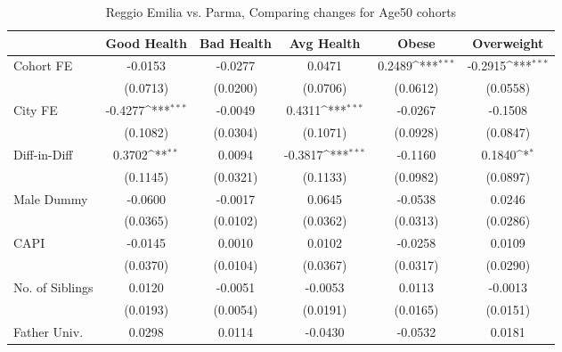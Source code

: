 \begin{table}[htbp]\centering
\def\sym#1{\ifmmode^{#1}\else\(^{#1}\)\fi}
\caption{Reggio Emilia vs. Parma, Comparing changes for Age50 cohorts}
\begin{tabular}{l*{5}{c}}
\toprule
            &\multicolumn{1}{c}{Good Health}&\multicolumn{1}{c}{Bad Health}&\multicolumn{1}{c}{Avg Health}&\multicolumn{1}{c}{Obese}&\multicolumn{1}{c}{Overweight}\\
\midrule
Cohort FE   &     -0.0153         &     -0.0277         &      0.0471         &      0.2489\sym{***}&     -0.2915\sym{***}\\
            &    (0.0713)         &    (0.0200)         &    (0.0706)         &    (0.0612)         &    (0.0558)         \\
\addlinespace
City FE     &     -0.4277\sym{***}&     -0.0049         &      0.4311\sym{***}&     -0.0267         &     -0.1508         \\
            &    (0.1082)         &    (0.0304)         &    (0.1071)         &    (0.0928)         &    (0.0847)         \\
\addlinespace
Diff-in-Diff&      0.3702\sym{**} &      0.0094         &     -0.3817\sym{***}&     -0.1160         &      0.1840\sym{*}  \\
            &    (0.1145)         &    (0.0321)         &    (0.1133)         &    (0.0982)         &    (0.0897)         \\
\addlinespace
Male Dummy  &     -0.0600         &     -0.0017         &      0.0645         &     -0.0538         &      0.0246         \\
            &    (0.0365)         &    (0.0102)         &    (0.0362)         &    (0.0313)         &    (0.0286)         \\
\addlinespace
CAPI        &     -0.0145         &      0.0010         &      0.0102         &     -0.0258         &      0.0109         \\
            &    (0.0370)         &    (0.0104)         &    (0.0367)         &    (0.0317)         &    (0.0290)         \\
\addlinespace
No. of Siblings&      0.0120         &     -0.0051         &     -0.0053         &      0.0113         &     -0.0013         \\
            &    (0.0193)         &    (0.0054)         &    (0.0191)         &    (0.0165)         &    (0.0151)         \\
\addlinespace
Father Univ.&      0.0298         &      0.0114         &     -0.0430         &     -0.0532         &      0.0181         \\

\end{tabular}
\end{table}
